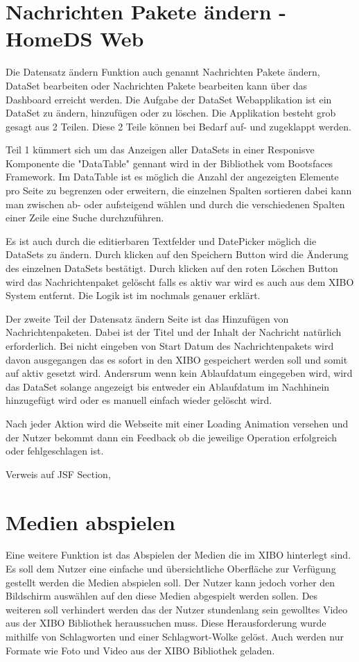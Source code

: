 \section{Nachrichten Pakete ändern - HomeDS Web}\label{sec:homedswebdataset}
Die Datensatz ändern Funktion auch genannt Nachrichten Pakete ändern, DataSet bearbeiten oder Nachrichten Pakete bearbeiten kann über das Dashboard erreicht werden.
Die Aufgabe der DataSet Webapplikation ist ein DataSet zu ändern, hinzufügen oder zu löschen. Die Applikation besteht grob gesagt aus 2 Teilen. Diese 2 Teile können bei Bedarf auf- und zugeklappt werden.

Teil 1 kümmert sich um das Anzeigen aller DataSets in einer Responisve Komponente die "DataTable" gennant wird in der Bibliothek vom Bootsfaces Framework. Im DataTable ist es möglich die Anzahl der angezeigten Elemente pro Seite zu begrenzen oder erweitern,  die einzelnen Spalten sortieren dabei kann man zwischen ab- oder aufsteigend wählen und durch die verschiedenen Spalten einer Zeile eine Suche durchzuführen. 

Es ist auch durch die editierbaren Textfelder und DatePicker möglich die DataSets zu ändern. Durch klicken auf den Speichern Button wird die Änderung des einzelnen DataSets bestätigt. Durch klicken auf den roten Löschen Button wird das Nachrichtenpaket gelöscht falls es aktiv war wird es auch aus dem XIBO System entfernt. Die Logik ist im \pageref{sec:datasetexpiredate} nochmals genauer erklärt. 

Der zweite Teil der Datensatz ändern Seite ist das Hinzufügen von Nachrichtenpaketen. Dabei ist der Titel und der Inhalt der Nachricht natürlich erforderlich. Bei nicht eingeben von Start Datum des Nachrichtenpakets wird davon ausgegangen das es sofort in den XIBO gespeichert werden soll und somit auf aktiv gesetzt wird. Andersrum wenn kein Ablaufdatum eingegeben wird, wird das DataSet solange angezeigt bis entweder ein Ablaufdatum im Nachhinein hinzugefügt wird oder es manuell einfach wieder gelöscht wird.

Nach jeder Aktion wird die Webseite mit einer Loading Animation versehen und der Nutzer bekommt dann ein Feedback ob die jeweilige Operation erfolgreich oder fehlgeschlagen ist. 

Verweis auf JSF Section,


\section{Medien abspielen}\label{sec:playmedia}
Eine weitere Funktion ist das Abspielen der Medien die im XIBO hinterlegt sind. Es soll dem Nutzer eine einfache und übersichtliche Oberfläche zur Verfügung gestellt werden die Medien abspielen soll. Der Nutzer kann jedoch vorher den Bildschirm auswählen auf den diese Medien abgespielt werden sollen. Des weiteren soll verhindert werden das der Nutzer stundenlang sein gewolltes Video aus der XIBO Bibliothek heraussuchen muss. Diese Herausforderung wurde mithilfe von Schlagworten und einer Schlagwort-Wolke gelöst. Auch werden nur Formate wie Foto und Video aus der XIBO Bibliothek geladen.

